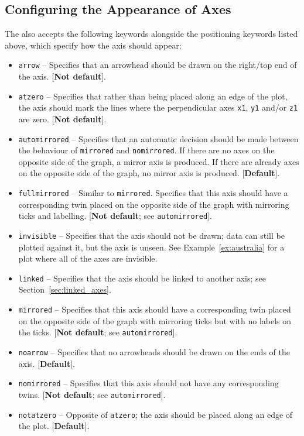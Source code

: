 \subsection{Configuring the Appearance of Axes}

The  also accepts the following keywords alongside the
positioning keywords listed above, which specify how the axis should appear:
\begin{itemize}
\item {\tt arrow} -- Specifies that an arrowhead should be drawn on the right/top end of the axis. [{\bf Not default}].
\item {\tt atzero} -- Specifies that rather than being placed along an edge of the plot, the axis should mark the lines where the perpendicular axes {\tt x1}, {\tt y1} and/or {\tt z1} are zero. [{\bf Not default}].
\item {\tt automirrored} -- Specifies that an automatic decision should be made between the behaviour of {\tt mirrored} and {\tt nomirrored}. If there are no axes on the opposite side of the graph, a mirror axis is produced. If there are already axes on the opposite side of the graph, no mirror axis is produced. [{\bf Default}].
\item {\tt fullmirrored} -- Similar to {\tt mirrored}. Specifies that this axis should have a corresponding twin placed on the opposite side of the graph with mirroring ticks and labelling. [{\bf Not default}; see {\tt automirrored}].
\item {\tt invisible} -- Specifies that the axis should not be drawn; data can still be plotted against it, but the axis is unseen. See Example~\ref{ex:australia} for a plot where all of the axes are invisible.
\item {\tt linked} -- Specifies that the axis should be linked to another axis; see Section~\ref{sec:linked_axes}.
\item {\tt mirrored} -- Specifies that this axis should have a corresponding twin placed on the opposite side of the graph with mirroring ticks but with no labels on the ticks. [{\bf Not default}; see {\tt automirrored}].
\item {\tt noarrow} -- Specifies that no arrowheads should be drawn on the ends of the axis. [{\bf Default}].
\item {\tt nomirrored} -- Specifies that this axis should not have any corresponding twins. [{\bf Not default}; see {\tt automirrored}].
\item {\tt notatzero} -- Opposite of {\tt atzero}; the axis should be placed along an edge of the plot. [{\bf Default}].

\end{itemize}
